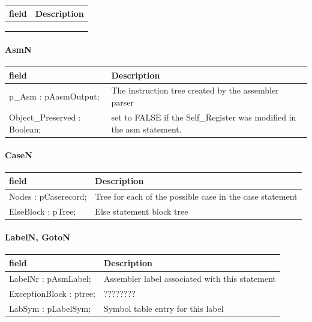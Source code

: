 \documentclass [a4paper,12pt]{article}
\begin{document}
\begin{longtable}{|l|p{10cm}|}
\hline
field	& Description \\
\hline
\endhead
\hline
\endfoot
  &  \\
  &  \\
  & 
\end{longtable}

\paragraph{AsmN}\mbox{}

\begin{longtable}{|l|p{10cm}|}
\hline
field	& Description \\
\hline
\endhead
\hline
\endfoot
\textsf{p{\_}Asm : pAasmOutput;}&
The instruction tree created by the assembler parser \\
\textsf{Object{\_}Preserved : Boolean;}&
set to FALSE if the Self{\_}Register was modified in the asm statement. 
\label{tab29}
\end{longtable}

\paragraph{CaseN}\mbox{}

\begin{longtable}{|l|p{10cm}|}
\hline
field	& Description \\
\hline
\endhead
\hline
\endfoot
\textsf{Nodes : pCaserecord;}&
	Tree for each of the possible case in the case statement \\
\textsf{ElseBlock : pTree;}&
	Else statement block tree
\label{tab30}
\end{longtable}

\paragraph{LabelN, GotoN}\mbox{}

\begin{longtable}{|l|p{10cm}|}
\hline
field	& Description \\
\hline
\endhead
\hline
\endfoot
\textsf{LabelNr : pAsmLabel;}   & Assembler label associated with this statement \\
\textsf{ExceptionBlock : ptree;}& ???????? \\
\textsf{LabSym : pLabelSym;}    & Symbol table entry for this label
\label{tab31}
\end{longtable}
\end{document}
